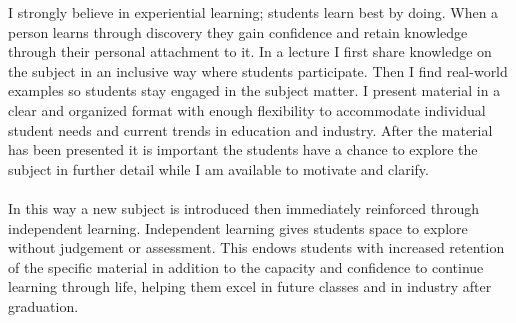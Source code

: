 
\begin{minipage}[t]{\textwidth} %
	\vspace{-\baselineskip} %
I strongly believe in experiential learning; students learn best by doing. When a person learns through discovery they gain confidence and retain knowledge through their personal attachment to it. In a lecture I first share knowledge on the subject in an inclusive way where students participate. Then I find real-world examples so students stay engaged in the subject matter. I present material in a clear and organized format with enough flexibility to
accommodate individual student needs and current trends in education and industry. After the material has been presented it is important the students have a chance to explore the subject in further detail while I am available
to motivate and clarify.
\\\\
In this way a new subject is introduced then immediately reinforced
through independent learning. Independent learning gives students space to explore  without judgement or assessment. This endows students with increased retention of the specific material in addition to the capacity and confidence to continue learning through life, helping
them excel in future classes and in industry after graduation.

\end{minipage}


